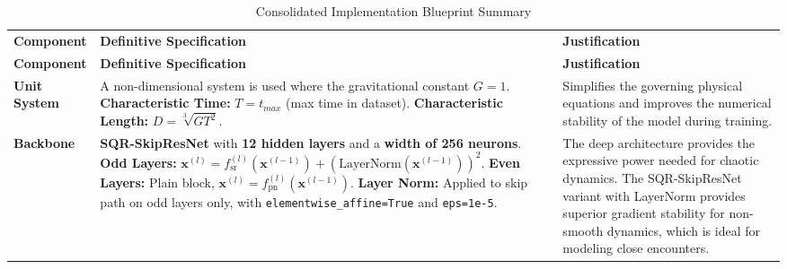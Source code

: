 \documentclass{article}
\begin{document}

\begin{small}
\begin{longtable}{|>{\raggedright\arraybackslash}p{}|>{\raggedright\arraybackslash}p{}|>{\raggedright\arraybackslash}p{}|}
\caption{Consolidated Implementation Blueprint Summary}\label{tab:blueprint_summary} \\
\hline
\multicolumn{3}{|c|}{\textbf{Consolidated Implementation Blueprint Summary}} \\
\hline
\textbf{Component} & \textbf{Definitive Specification} & \textbf{Justification} \\
\hline
\endfirsthead
\hline
\textbf{Component} & \textbf{Definitive Specification} & \textbf{Justification} \\
\hline
\endhead
\textbf{Unit System} & A non-dimensional system is used where the gravitational constant $G=1$. \newline \textbullet{} \textbf{Characteristic Time:} $T=t_{max}$ (max time in dataset). \newline \textbullet{} \textbf{Characteristic Length:} $D=\sqrt[3]{GT^{2}}$. & Simplifies the governing physical equations and improves the numerical stability of the model during training. \\
\hline
\textbf{Backbone} & \textbf{SQR-SkipResNet} with \textbf{12 hidden layers} and a \textbf{width of 256 neurons}. \newline \textbullet{} \textbf{Odd Layers:} $\mathbf{x}^{(l)} = f_{\text{sr}}^{(l)}(\mathbf{x}^{(l-1)}) + (\mathrm{LayerNorm}(\mathbf{x}^{(l-1)}))^2$. \newline \textbullet{} \textbf{Even Layers:} Plain block, $\mathbf{x}^{(l)} = f_{\text{pn}}^{(l)}(\mathbf{x}^{(l-1)})$. \newline \textbullet{} \textbf{Layer Norm:} Applied to skip path on odd layers only, with \texttt{elementwise\_affine=True} and \texttt{eps=1e-5}. & The deep architecture provides the expressive power needed for chaotic dynamics. The SQR-SkipResNet variant with LayerNorm provides superior gradient stability for non-smooth dynamics, which is ideal for modeling close encounters. \\

\end{longtable}
\end{small}
\end{document}

